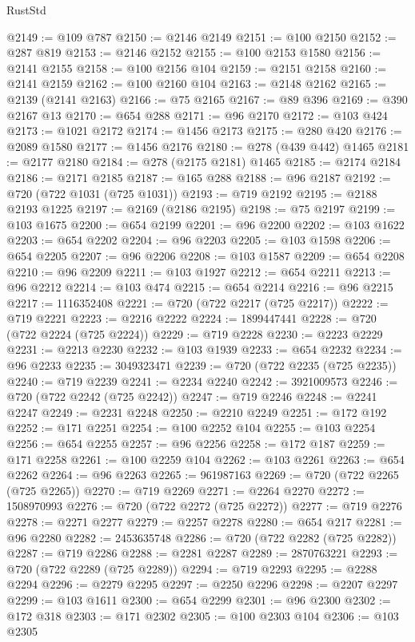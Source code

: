 \begin{lexlean}{RustStd}
\begin{coremodule}
@2149 := @109 @787
@2150 := @2146 @2149
@2151 := @100 @2150
@2152 := @287 @819
@2153 := @2146 @2152
@2155 := @100 @2153 @1580
@2156 := @2141 @2155
@2158 := @100 @2156 @104
@2159 := @2151 @2158
@2160 := @2141 @2159
@2162 := @100 @2160 @104
@2163 := @2148 @2162
@2165 := @2139 (@2141 @2163)
@2166 := @75 @2165
@2167 := @89 @396
@2169 := @390 @2167 @13
@2170 := @654 @288
@2171 := @96 @2170
@2172 := @103 @424
@2173 := @1021 @2172
@2174 := @1456 @2173
@2175 := @280 @420
@2176 := @2089 @1580
@2177 := @1456 @2176
@2180 := @278 (@439 @442) @1465
@2181 := @2177 @2180
@2184 := @278 (@2175 @2181) @1465
@2185 := @2174 @2184
@2186 := @2171 @2185
@2187 := @165 @288
@2188 := @96 @2187
@2192 := @720 (@722 @1031 (@725 @1031))
@2193 := @719 @2192
@2195 := @2188 @2193 @1225
@2197 := @2169 (@2186 @2195)
@2198 := @75 @2197
@2199 := @103 @1675
@2200 := @654 @2199
@2201 := @96 @2200
@2202 := @103 @1622
@2203 := @654 @2202
@2204 := @96 @2203
@2205 := @103 @1598
@2206 := @654 @2205
@2207 := @96 @2206
@2208 := @103 @1587
@2209 := @654 @2208
@2210 := @96 @2209
@2211 := @103 @1927
@2212 := @654 @2211
@2213 := @96 @2212
@2214 := @103 @474
@2215 := @654 @2214
@2216 := @96 @2215
@2217 := 1116352408
@2221 := @720 (@722 @2217 (@725 @2217))
@2222 := @719 @2221
@2223 := @2216 @2222
@2224 := 1899447441
@2228 := @720 (@722 @2224 (@725 @2224))
@2229 := @719 @2228
@2230 := @2223 @2229
@2231 := @2213 @2230
@2232 := @103 @1939
@2233 := @654 @2232
@2234 := @96 @2233
@2235 := 3049323471
@2239 := @720 (@722 @2235 (@725 @2235))
@2240 := @719 @2239
@2241 := @2234 @2240
@2242 := 3921009573
@2246 := @720 (@722 @2242 (@725 @2242))
@2247 := @719 @2246
@2248 := @2241 @2247
@2249 := @2231 @2248
@2250 := @2210 @2249
@2251 := @172 @192
@2252 := @171 @2251
@2254 := @100 @2252 @104
@2255 := @103 @2254
@2256 := @654 @2255
@2257 := @96 @2256
@2258 := @172 @187
@2259 := @171 @2258
@2261 := @100 @2259 @104
@2262 := @103 @2261
@2263 := @654 @2262
@2264 := @96 @2263
@2265 := 961987163
@2269 := @720 (@722 @2265 (@725 @2265))
@2270 := @719 @2269
@2271 := @2264 @2270
@2272 := 1508970993
@2276 := @720 (@722 @2272 (@725 @2272))
@2277 := @719 @2276
@2278 := @2271 @2277
@2279 := @2257 @2278
@2280 := @654 @217
@2281 := @96 @2280
@2282 := 2453635748
@2286 := @720 (@722 @2282 (@725 @2282))
@2287 := @719 @2286
@2288 := @2281 @2287
@2289 := 2870763221
@2293 := @720 (@722 @2289 (@725 @2289))
@2294 := @719 @2293
@2295 := @2288 @2294
@2296 := @2279 @2295
@2297 := @2250 @2296
@2298 := @2207 @2297
@2299 := @103 @1611
@2300 := @654 @2299
@2301 := @96 @2300
@2302 := @172 @318
@2303 := @171 @2302
@2305 := @100 @2303 @104
@2306 := @103 @2305

\end{coremodule}
\end{lexlean}
